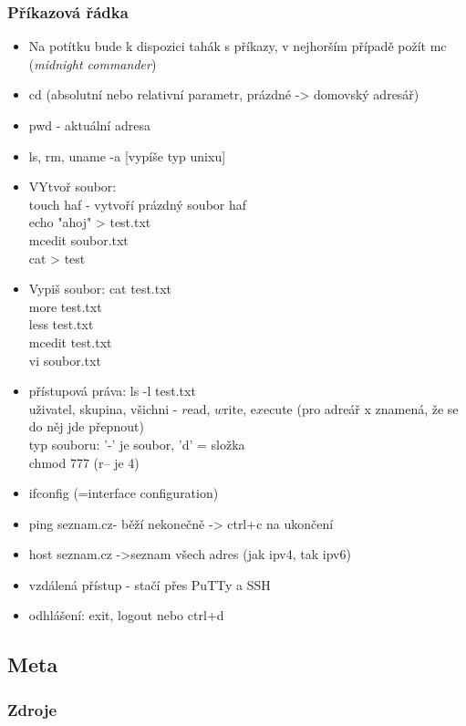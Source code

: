 \documentclass[12pt]{article}
\begin{document}
\subsubsection{Příkazová řádka}
\begin{itemize}
\item Na potítku bude k dispozici tahák s příkazy, v nejhorším případě požít mc (\emph{midnight commander})
\item cd (absolutní nebo relativní parametr, prázdné -> domovský adresář)
\item pwd - aktuální adresa
\item ls, rm, uname -a [vypíše typ unixu]
\item VYtvoř soubor:\\
 touch  haf - vytvoří prázdný soubor haf\\
 echo "ahoj" > test.txt\\
 mcedit soubor.txt\\
 cat > test\\
\item Vypiš soubor:
cat test.txt\\
more test.txt\\
less test.txt\\
mcedit test.txt\\
 vi soubor.txt
\item přístupová práva: ls -l test.txt\\
uživatel, skupina, všichni - $r$ead, $w$rite, e$x$ecute (pro adreář x znamená, že se do něj jde přepnout)\\
typ souboru: '-' je soubor, 'd' = složka\\
chmod 777 (r-- je 4)\\
\item ifconfig (=interface configuration)
\item ping seznam.cz- běží nekonečně -> ctrl+c na ukončení
\item host seznam.cz ->seznam všech adres (jak ipv4, tak ipv6)

\item vzdálená přístup - stačí přes PuTTy a SSH
\item odhlášení: exit, logout nebo ctrl+d


\end{itemize}
\subsection{Meta}
\subsubsection{Zdroje}
\end{document}
